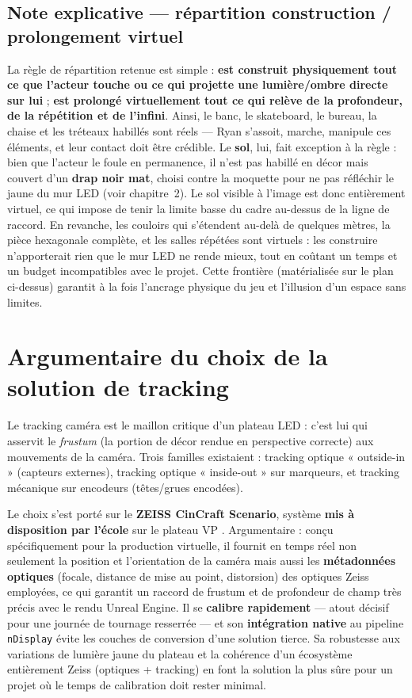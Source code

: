 \documentclass[11pt,a4paper]{report}
\begin{document}
\subsection{Note explicative --- répartition construction / prolongement virtuel}
La règle de répartition retenue est simple : \textbf{est construit physiquement tout ce que l'acteur touche ou ce qui projette une lumière/ombre directe sur lui} ; \textbf{est prolongé virtuellement tout ce qui relève de la profondeur, de la répétition et de l'infini}. Ainsi, le banc, le skateboard, le bureau, la chaise et les tréteaux habillés sont réels --- Ryan s'assoit, marche, manipule ces éléments, et leur contact doit être crédible. Le \textbf{sol}, lui, fait exception à la règle : bien que l'acteur le foule en permanence, il n'est pas habillé en décor mais couvert d'un \textbf{drap noir mat}, choisi contre la moquette pour ne pas réfléchir le jaune du mur LED (voir chapitre~2). Le sol visible à l'image est donc entièrement virtuel, ce qui impose de tenir la limite basse du cadre au-dessus de la ligne de raccord. En revanche, les couloirs qui s'étendent au-delà de quelques mètres, la pièce hexagonale complète, et les salles répétées sont virtuels : les construire n'apporterait rien que le mur LED ne rende mieux, tout en coûtant un temps et un budget incompatibles avec le projet. Cette frontière (matérialisée sur le plan ci-dessus) garantit à la fois l'ancrage physique du jeu et l'illusion d'un espace sans limites.

\section{Argumentaire du choix de la solution de tracking}
Le tracking caméra est le maillon critique d'un plateau LED : c'est lui qui asservit le \emph{frustum} (la portion de décor rendue en perspective correcte) aux mouvements de la caméra. Trois familles existaient : tracking optique « outside-in » (capteurs externes), tracking optique « inside-out » sur marqueurs, et tracking mécanique sur encodeurs (têtes/grues encodées).

Le choix s'est porté sur le \textbf{ZEISS CinCraft Scenario}, système \textbf{mis à disposition par l'école} sur le plateau VP \autocite{zeiss_cincraft}. Argumentaire : conçu spécifiquement pour la production virtuelle, il fournit en temps réel non seulement la position et l'orientation de la caméra mais aussi les \textbf{métadonnées optiques} (focale, distance de mise au point, distorsion) des optiques Zeiss employées, ce qui garantit un raccord de frustum et de profondeur de champ très précis avec le rendu Unreal Engine. Il se \textbf{calibre rapidement} --- atout décisif pour une journée de tournage resserrée --- et son \textbf{intégration native} au pipeline \texttt{nDisplay} évite les couches de conversion d'une solution tierce. Sa robustesse aux variations de lumière jaune du plateau et la cohérence d'un écosystème entièrement Zeiss (optiques + tracking) en font la solution la plus sûre pour un projet où le temps de calibration doit rester minimal.
\end{document}
